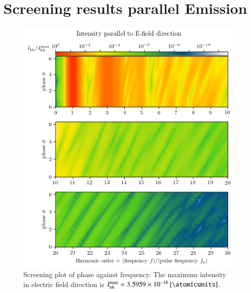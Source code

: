 \documentclass[11pt, a4paper]{scrartcl}
\begin{document}
\section{Screening results parallel Emission}
\begin{figure}[H]
    \centering
    \includegraphics[width=\textwidth]{phase=variable_E_dir_plot.png}
    \caption{Screening plot of phase against frequency. The maximum intensity in electric
      field direction is $I_{\mathrm{hh}}^{\mathrm{max}} = \SI{3.5959e-16}{[\atomicunits]}$.}
    \label{fig:sec1_parallel_screening}
\end{figure}
\end{document}
